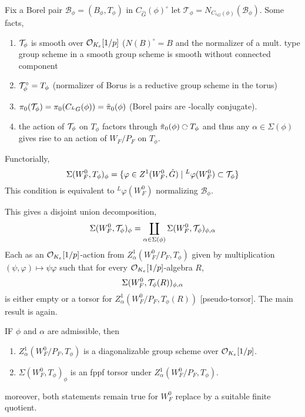 \documentclass[12pt]{article}
\begin{document}
\newcommand{\B}{\mathcal{B}}
\newcommand{\cT}{\mathcal{T}}


Fix a Borel pair $\B_\phi = (B_\phi, T_\phi)$ in $C_{\hat{G}}(\phi)^\circ$ let $\cT_\phi = N_{C_{{}^L G}(\phi)}(\B_\phi)$. Some facts,
\begin{enumerate}
\item $\mathcal{T}_\phi$ is smooth over $\mathcal{O}_{K_e}[1/p]$ ($N(B)^\circ = B$ and the normalizer of a mult. type group scheme in a smooth group scheme is smooth without connected component
\item $\mathcal{T}_\phi^\circ = T_\phi$ (normalizer of Borus is a reductive group scheme in the torus)
\item $\pi_0(\mathcal{T}_\phi) = \pi_0(C_{{}^L G}(\phi)) = \tilde{\pi}_0(\phi)$ (Borel pairs are \etale-locally conjugate). 

\item the action of $\mathcal{T}_\phi$ on $T_\phi$ factors through $\tilde{\pi}_0(\phi) \acts T_\phi$ and thus any $\alpha \in \Sigma(\phi)$ gives rise to an action of $W_F / P_F$ on $T_\phi$. 
\end{enumerate}

\begin{defn}
Functorially,
\[ \Sigma(W_F^0, T_\phi)_\phi = \{ \varphi \in Z^1(W_F^0, \hat{G}) \mid {}^L \varphi(W_F^0) \subset \mathcal{T}_\phi \} \] 
This condition is equivalent to ${}^L \varphi(W_F^0)$ normalizing $\B_\phi$.
\end{defn}

This gives a disjoint union decomposition,
\[ \Sigma(W^0_F, \mathcal{T}_\phi)_\phi = \coprod_{\alpha \in \Sigma(\phi)} \Sigma(W_F^0, \mathcal{T}_\phi)_{\phi,\alpha} \]
Each as an $\mathcal{O}_{K_e}[1/p]$-action from $Z^1_\alpha(W_F^0/P_F, T_\phi)$ given by multiplication $(\psi, \varphi) \mapsto \psi \varphi$ such that for every $\mathcal{O}_{K_e}[1/p]$-algebra $R$,
\[ \Sigma(W_F^0, \mathcal{T}_\phi(R))_{\phi, \alpha} \]
is either empty or a torsor for $Z^1_\alpha(W_F^0/P_F, T_\phi(R))$ [pseudo-torsor]. The main result is again.

\begin{theorem}
IF $\phi$ and $\alpha$ are admissible, then
\begin{enumerate}
\item $Z^1_\alpha(W_F^0/P_F, T_\phi)$ is a diagonalizable group scheme over $\mathcal{O}_{K_e}[1/p]$.
\item $\Sigma(W_F^0, T_\phi)_\phi$ is an fppf torsor under $Z^1_\alpha(W_F^0/P_F, T_\phi)$.
\end{enumerate}
moreover, both statements remain true for $W_F^0$ replace by a suitable finite quotient. 
\end{theorem}
\end{document}
